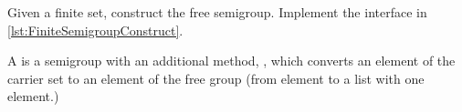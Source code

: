 \begin{codeexercise}
	\label{ex:TestFiniteSemigroupConstruct}
	Given a finite set, construct the free semigroup.
	Implement the interface in \cref{lst:FiniteSemigroupConstruct}.
\end{codeexercise}


A \FreeSemigroup is a semigroup with an additional method, , which converts an element of the carrier set to an element of the free group (\eg from element to a list with one element.)


